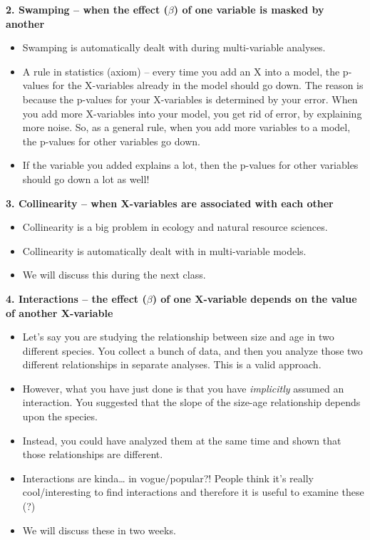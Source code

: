\documentclass[
]{article}
\providecommand{\tightlist}{%
  \setlength{\itemsep}{0pt}\setlength{\parskip}{0pt}}
\begin{document}
\textbf{2. Swamping -- when the effect (\(\beta\)) of one variable is
masked by another}

\begin{itemize}
\tightlist
\item
  Swamping is automatically dealt with during multi-variable analyses.
\item
  A rule in statistics (axiom) -- every time you add an X into a model,
  the p-values for the X-variables already in the model should go down.
  The reason is because the p-values for your X-variables is determined
  by your error. When you add more X-variables into your model, you get
  rid of error, by explaining more noise. So, as a general rule, when
  you add more variables to a model, the p-values for other variables go
  down.
\item
  If the variable you added explains a lot, then the p-values for other
  variables should go down a lot as well!
\end{itemize}

\textbf{3. Collinearity -- when X-variables are associated with each
other}

\begin{itemize}
\tightlist
\item
  Collinearity is a big problem in ecology and natural resource
  sciences.
\item
  Collinearity is automatically dealt with in multi-variable models.
\item
  We will discuss this during the next class.
\end{itemize}

\textbf{4. Interactions -- the effect (\(\beta\)) of one X-variable
depends on the value of another X-variable}

\begin{itemize}
\tightlist
\item
  Let's say you are studying the relationship between size and age in
  two different species. You collect a bunch of data, and then you
  analyze those two different relationships in separate analyses. This
  is a valid approach.
\item
  However, what you have just done is that you have \emph{implicitly}
  assumed an interaction. You suggested that the slope of the size-age
  relationship depends upon the species.
\item
  Instead, you could have analyzed them at the same time and shown that
  those relationships are different.
\item
  Interactions are kinda\ldots{} in vogue/popular?! People think it's
  really cool/interesting to find interactions and therefore it is
  useful to examine these (?)
\item
  We will discuss these in two weeks.
\end{itemize}
\end{document}
